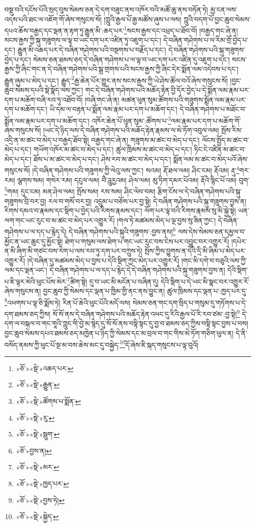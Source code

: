 བསྡུ་བའི་དངོས་པོའི་སྲད་བུས་སེམས་ཅན་དེ་དག་བཟུང་ནས་འཁོར་བའི་མཚོ་ཆུ་ནས་བཏོན་ཏེ། མྱ་ངན་ལས་འདས་པའི་ཐང་ལ་འཇོག་གོ་ཞེས་གསུངས་སོ། །ཀླུའི་རྒྱལ་པོ་རྒྱ་མཚོས་ཞུས་པ་ལས། ཀླུའི་བདག་པོ་བྱང་ཆུབ་སེམས་དཔའ་ཆོས་བརྒྱད་དང་ལྡན་ན་རྟག་ཏུ་རྒྱུན་མི་:ཆད་པར་\footnote{«ཅོ་»«སྡེ་»འཆད་པར་}སངས་རྒྱས་དང་འཕྲད་པ་ཐོབ་བོ། །བརྒྱད་གང་ཞེ་ན། སངས་རྒྱས་ཀྱི་སྐུ་གཟུགས་ལ་ལྟ་བ་ཡང་དག་པར་འཛིན་ཏུ་འཇུག་པ་དང་། དེ་བཞིན་གཤེགས་པ་ལ་རིམ་གྲོ་བྱེད་པ་དང་། རྒྱུན་མི་འཆད་པར་དེ་བཞིན་གཤེགས་པའི་བསྔགས་པ་བརྗོད་པ་དང་། དེ་བཞིན་གཤེགས་པའི་སྐུ་གཟུགས་བྱེད་པ་དང་། སེམས་ཅན་ཐམས་ཅད་དེ་བཞིན་གཤེགས་པ་ལ་ལྟ་བ་ཡང་དག་པར་འཛིན་དུ་འཇུག་པ་དང་། སངས་རྒྱས་ཀྱི་ཞིང་གང་ན་དེ་བཞིན་གཤེགས་པའི་སྒྲ་གྲགས་པའི་སངས་རྒྱས་ཀྱི་ཞིང་དེར་སྨོན་ལམ་འདེབས་པ་དང་། རྒྱུན་ཞུམ་པ་མེད་པ་དང་། རྒྱུད་\footnote{«ཅོ་»«སྡེ་»རྒྱུན་}རྒྱ་ཆེན་པོར་གྱུར་ནས་སངས་རྒྱས་ཀྱི་ཡེ་ཤེས་ཚོལ་བའོ་ཞེས་གསུངས་སོ། །བྱང་ཆུབ་སེམས་དཔའི་སྡེ་སྣོད་ལས་ཀྱང་། གང་དེ་བཞིན་གཤེགས་པའི་མཆོད་རྟེན་བྱི་དོར་བྱེད་པ་དེ་སྨོན་ལམ་རྣམ་པར་དག་པ་མཆོག་བཞི་རབ་ཏུ་འཐོབ་བོ། །བཞི་གང་ཞེ་ན། མཚན་ཕུན་སུམ་ཚོགས་པའི་གཟུགས་སྨོན་ལམ་རྣམ་པར་དག་པ་མཆོག་དང་། ཡི་དམ་ལ་བརྟན་པ་སྨོན་ལམ་རྣམ་པར་དག་པ་མཆོག་དང་། དེ་བཞིན་གཤེགས་པ་མཐོང་བ་སྨོན་ལམ་རྣམ་པར་དག་པ་མཆོག་དང་། འཁོར་ཆེན་པོ་ཕུན་སུམ་:ཚོགས་པ་\footnote{«ཅོ་»«སྡེ་»ཚོགས་པ་སྨོན་}ལམ་རྣམ་པར་དག་པ་མཆོག་གོ་ཞེས་གསུངས་སོ། །ཡང་དེ་ཉིད་ལས་དེ་བཞིན་གཤེགས་པའི་མཆོད་རྟེན་རྣམས་ལ་མེ་ཏོག་འབུལ་ལམ། སྤོས་རིས་འདྲི་ན་མ་ཚང་བ་མེད་པ་བརྒྱད་ཐོབ་སྟེ། བརྒྱད་གང་ཞེ་ན། གཟུགས་མ་ཚང་བ་མེད་པ་དང་། ལོངས་སྤྱོད་མ་ཚང་བ་མེད་པ་དང་། གཡོག་འཁོར་མ་ཚང་བ་མེད་པ་དང་། ཚུལ་ཁྲིམས་མ་ཚང་བ་མེད་པ་དང་། ཏིང་ངེ་འཛིན་མ་ཚང་བ་མེད་པ་དང་། ཐོས་པ་མ་ཚང་བ་མེད་པ་དང་། ཤེས་རབ་མ་ཚང་བ་མེད་པ་དང་། སྨོན་ལམ་མ་ཚང་བ་མེད་པའོ་ཞེས་གསུངས་སོ། །དེ་བཞིན་གཤེགས་པའི་གཟུགས་ཀྱི་ལེའུ་ལས་ཀྱང་། སའམ། རྡོ་ཐལ་ལམ། ཤིང་ངམ། རྡོའམ། རྡུ་\footnote{«ཅོ་»«སྡེ་»རུ་}གར་རམ། ལྕགས་སམ། གསེར་རམ། དངུལ་ལམ། བཻ་ཌཱུརྱའམ། ཤེལ་ལམ། མུ་ཏིག་དམར་པོའམ། རྡོའི་སྙིང་པོ་འམ། བུག་\footnote{«ཅོ་»«སྡེ་»སྦུག་}གམ། དུང་ངམ། མན་ཤེལ་ལམ། སྤོས་སམ། རས་སམ། ཤིང་ལེབ་བམ། རྩིག་ངོས་ལ་དེ་བཞིན་གཤེགས་པའི་སྐུ་གཟུགས་བྲི་བར་བྱ། རལ་བ་གསོ་བར་བྱ། འདྲུམ་པ་བཅོས་པར་བྱ་སྟེ། དེ་བཞིན་གཤེགས་པའི་སྐུ་གཟུགས་བྱས་ན། རིགས་དམའ་བ་རྣམས་དང་སྡིག་པ་བྱེད་པའི་རིགས་རྣམས་དང་། ལོག་པར་ལྟ་བའི་རིགས་རྣམས་སུ་མི་སྐྱེ་སྟེ། ཡན་ལག་གང་ཡང་རུང་བ་མ་ཚང་བ་མེད་པར་འགྱུར་རོ། །གལ་ཏེ་མཚམས་མེད་པ་ལྔ་བྱས་སུ་ཟིན་ཀྱང་། དེ་བཞིན་གཤེགས་པ་ལ་དད་པ་རྙེད་དེ། དེ་བཞིན་གཤེགས་པའི་སྐུའི་གཟུགས་:བྱས་ནས།\footnote{«ཅོ་»བྱས་ན།} ལས་དེས་སེམས་ཅན་དམྱལ་བ་མྱོང་ན་ཡང་ཆུང་དུ་མྱོང་སྟེ། ཐེག་པ་གསུམ་ལས་ཐེག་པ་གང་ཡང་རུང་བས་ངེས་པར་འབྱུང་བར་འགྱུར་རོ། །དཔེར་ན་མི་ཞིག་མི་གཙང་བས་རེག་པ་ལས་རབ་ཏུ་དག་པར་བཀྲུས་ཏེ། སྤོས་ཀྱིས་བྱུགས་ན་དེའི་དྲི་མི་ཞིམ་པ་མེད་པར་འགྱུར་རོ། །དེ་བཞིན་དུ་མཚམས་མེད་པ་བྱས་པ་དེའི་སྡིག་ཀྱང་མེད་པར་འགྱུར་རོ། །གང་མི་དགེ་བ་བཅུའི་ལས་ཀྱི་ལམ་དང་ལྡན་ཡང་། དེ་བཞིན་གཤེགས་པ་ལ་དད་པ་རྙེད་དེ་དེ་བཞིན་གཤེགས་པའི་སྐུ་གཟུགས་བྱས་ན། དེའི་སྡིག་པ་ཇི་ལྟར་མེའི་ཕུང་པོས་མེར་\footnote{«ཅོ་»«སྡེ་»མར་}ཚིག་སྟེ། དུ་བ་ཡང་མི་མངོན་པ་བཞིན་དུ། དེའི་སྡིག་པ་དེ་ཡང་མི་སྣང་བར་འགྱུར་རོ་ཞེས་གསུངས་ན། བྱང་ཆུབ་ཀྱི་སེམས་དང་ལྡན་པ་ཁྱིམ་གྱི་ནང་ནས་བྱུང་ན། ཚུལ་ཁྲིམས་དང་ལྡན་པ་:ཁྱད་པར་དུ་\footnote{«ཅོ་»«སྡེ་»ཁྱད་པར་}འཕགས་པ་ལྟ་ཅི་སྨོས་ཏེ། རིན་པོ་ཆེའི་ཕུང་པོའི་མདོ་ལས། སེམས་ཅན་གང་དག་སྲིད་པ་གསུམ་དུ་གཏོགས་པ་དེ་དག་ཐམས་ཅད་ཀྱིས། སོ་སོ་ནས་དེ་བཞིན་གཤེགས་པའི་མཆོད་རྟེན་འཕང་དུ་རིའི་རྒྱལ་པོ་རི་རབ་ཙམ་:བྱ་སྟེ།\footnote{«ཅོ་»«སྡེ་»བྱས་ཏེ།} དེ་དག་ལ་བསྐལ་བ་གང་གཱའི་ཀླུང་གི་བྱེ་མ་སྙེད་དུ་སོ་སོ་ནས་བསྟི་སྟང་དུ་བྱ་བ་ཐམས་ཅད་ཀྱིས་བསྟི་སྟང་བྱས་པ་བས། བྱང་ཆུབ་སེམས་དཔའ་ཐམས་ཅད་མཁྱེན་པ་ཉིད་ཀྱི་སེམས་དང་མ་བྲལ་བ་གང་གིས་མེ་ཏོག་གཅིག་ཕུལ་ན། དེ་ནི་བསོད་ནམས་ཀྱི་ཕུང་པོ་སྔ་མ་བས་ཆེས་མང་དུ་བསྐྱེད་\footnote{«ཅོ་»«སྡེ་»སྐྱེད་}དོ་ཞེས་ཇི་སྐད་གསུངས་པ་ལྟ་བུའོ། 